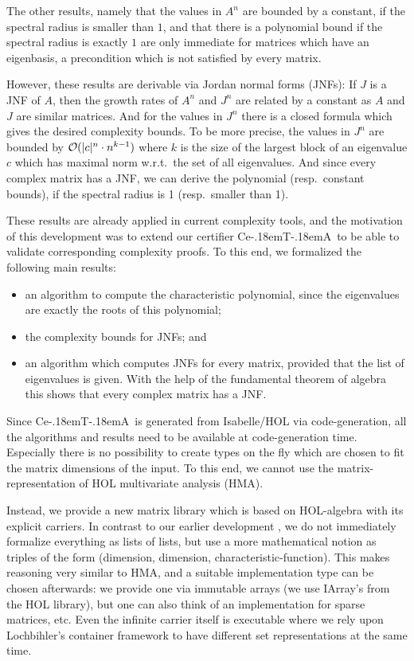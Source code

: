 \documentclass[11pt,a4paper]{article}
\newcommand\ceta{\textsf{Ce\kern-.18emT\kern-.18emA}}
\begin{document}
The other results, namely
that the values in $A^n$ are bounded by a constant, 
if the spectral radius is smaller
than $1$, and that there is a polynomial bound if the spectral radius
is exactly $1$ are only immediate for matrices which have an eigenbasis,
a precondition which is not satisfied by every matrix.

However, these results are derivable via Jordan normal forms (JNFs): 
If $J$ is a JNF of $A$, then the growth rates of $A^n$ and $J^n$ are related
by a constant as $A$ and $J$ are similar matrices. And for the values in $J^n$ 
there is a closed formula which gives the desired complexity bounds.
To be more precise, the values in $J^n$ are bounded by 
${\cal O}(|c|^n \cdot n^{k-1})$ where $k$ is the size of the largest
block of an eigenvalue $c$ which has maximal norm w.r.t.\ the set of all
eigenvalues. And since every complex matrix has a JNF, we can derive the 
polynomial (resp.\ constant bounds), if the spectral radius is 1 (resp.\ smaller
than 1).

These results are already applied in current complexity tools, and the motivation
of this development was to extend our certifier \ceta\ to be able to validate
corresponding complexity proofs. To this end, we formalized
the  following main results:
\begin{itemize}
\item an algorithm to compute the characteristic polynomial, since
  the eigenvalues are exactly the roots of this polynomial;
\item the complexity bounds for JNFs; and
\item an algorithm which computes JNFs for every matrix, provided that the
  list of eigenvalues is given. With the help of the fundamental theorem
  of algebra this shows that every complex matrix has a JNF.
\end{itemize}

Since \ceta\ is generated from Isabelle/HOL via code-generation, all the 
algorithms and results need to be available at code-generation time. Especially
there is no possibility to create types on the fly which are chosen to fit 
the matrix dimensions of the input. To this end, we cannot use the 
matrix-representation of HOL multivariate analysis (HMA).

Instead, we provide a new matrix library which is based on HOL-algebra with
its explicit carriers. In contrast to our earlier development \cite{Matrix-AFP}, 
we do not immediately formalize everything as lists of lists, 
but use a more mathematical
notion as triples of the form (dimension, dimension, characteristic-function).
This makes reasoning very similar to HMA, and a suitable implementation type
can be chosen afterwards: we provide one via immutable arrays (we use IArray's from
the HOL library),
but one can also think of an implementation for sparse matrices, etc.
Even the infinite carrier itself is executable where we rely upon Lochbihler's
container framework \cite{Containers-AFP} to have different set representations 
at the same time.
\end{document}
